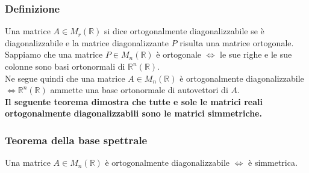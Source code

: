 \documentclass[../main.tex]{subfiles}
\begin{document}
\subsubsection{Definizione}
Una matrice $A\in M_r (\mathbb{R})$ si dice ortogonalmente diagonalizzabile se
è diagonalizzabile e la matrice diagonalizzante $P$ risulta una matrice
ortogonale.\\ Sappiamo che una matrice $P\in M_n(\mathbb{R})$ è ortogonale
$\iff$ le sue righe e le sue colonne sono basi ortonormali di $\mathbb{R}^n
    (\mathbb{R})$.\\ Ne segue quindi che una matrice $A\in M_n(\mathbb{R})$ è
ortogonalmente diagonalizzabile $\iff \mathbb{R}^n (\mathbb{R})$ ammette una
base ortonormale di autovettori di $A$.\\ \textbf{Il seguente teorema dimostra
    che tutte e sole le matrici reali ortogonalmente diagonalizzabili sono le
    matrici simmetriche.}

\subsubsection{Teorema della base spettrale}
Una matrice $A\in M_n(\mathbb{R})$ è ortogonalmente diagonalizzabile $\iff$ è
simmetrica.
\end{document}
